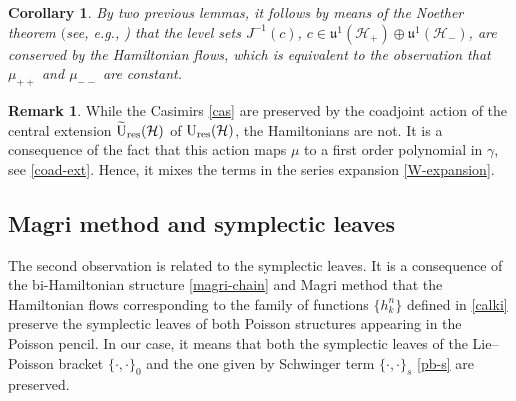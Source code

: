 \documentclass[10pt,a4paper]{amsart}
\newtheorem{cor}[thm]{Corollary}
\theoremstyle{definition}
\newtheorem{rem}[thm]{Remark}
\numberwithin{equation}{section}
\renewcommand{\H}{\mathcal{H}}
\newcommand{\Ur}{\mathrm{U}_{\textnormal{res}}(\H)}
\newcommand{\Urt}{\widetilde{\mathrm{U}}_{\textnormal{res}}(\H)}
\newcommand{\uujp}{\mathfrak u^1(\H_+)}\newcommand{\uujm}{\mathfrak u^1(\H_-)}
\newcommand{\pb}{\{\cdot,\cdot\}}
\begin{document}
\begin{cor}
By two previous lemmas, it follows by means of the Noether theorem $($see, e.g., {\rm\cite[\emph{Theorem}~8.2]{OR})} that the level sets $J^{-1}(c)$, $c\in \uujp\oplus \uujm$, are conserved by the Hamiltonian flows, which is equivalent to the observation that $\mu_{++}$ and $\mu_{--}$ are constant.
\end{cor}

\begin{rem}
While the Casimirs \eqref{cas} are preserved by the coadjoint action of the central extension $\Urt$ of $\Ur$, the Hamiltonians are not. It is a consequence of the fact that this action maps $\mu$ to a first order polynomial in $\gamma$, see \eqref{coad-ext}.
Hence, it mixes the terms in the series expansion \eqref{W-expansion}.
\end{rem}

\subsection{Magri method and symplectic leaves}
The second observation is related to the symplectic leaves.
It is a consequence of the bi-Hamiltonian structure \eqref{magri-chain} and Magri method that the Hamiltonian flows corresponding to the family of functions $\{h^n_k\}$ defined in \eqref{calki} preserve the symplectic leaves of both Poisson structures appearing in the Poisson pencil.
In our case, it means that both the symplectic leaves of the Lie--Poisson bracket $\pb_0$ and the one given by Schwinger term $\pb_s$ \eqref{pb-s}
are preserved.
\end{document}
